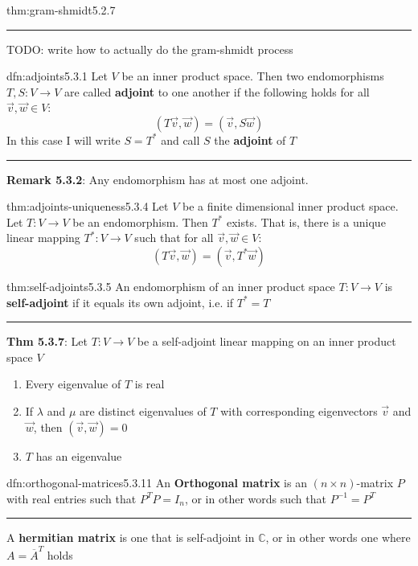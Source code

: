 \documentclass[landscape, 8pt]{extarticle}
\begin{document}
\begin{multicols}{3}
\begin{thm}{thm:gram-shmidt}{5.2.7}
    \noindent\rule{\textwidth}{0.2pt}
    TODO: write how to actually do the gram-shmidt process
\end{thm}

\begin{dfn}[Adjoints]{dfn:adjoints}{5.3.1}
    Let $V$ be an inner product space. Then two endomorphisms $T, S : V\to V$ are called \textbf{adjoint} to one another if the following holds for all $\vec{v}, \vec{w}\in V$:
    \[(T \vec{v}, \vec{w}) = (\vec{v}, S\vec{w})\]
    In this case I will write $S = T^{*}$ and call $S$ the \textbf{adjoint} of $T$

    \noindent\rule{\textwidth}{0.2pt}
    \textbf{Remark 5.3.2}: Any endomorphism has at most one adjoint.
\end{dfn}

\begin{thm}[]{thm:adjoints-uniqueness}{5.3.4}
    Let $V$ be a finite dimensional inner product space. Let $T : V \to V$ be an endomorphism. Then $T^{*}$ exists. That is, there is a unique linear mapping $T^{*} : V \to V$ such that for all $\vec{v}, \vec{w}\in V$:
    \[(T \vec{v}, \vec{w}) = (\vec{v}, T^{*}\vec{w})\]
\end{thm}

\begin{dfn}{thm:self-adjoints}{5.3.5}
    An endomorphism of an inner product space $T : V \to V$ is \textbf{self-adjoint} if it equals its own adjoint, i.e. if $T^{*} = T$

    \noindent\rule{\textwidth}{0.2pt}
    \textbf{Thm 5.3.7}: Let $T : V\to V$ be a self-adjoint linear mapping on an inner product space $V$
    \begin{enumerate}
        \setlength\itemsep{0em}
        \item Every eigenvalue of $T$ is real
        \item If $\lambda$ and $\mu$ are distinct eigenvalues of $T$ with corresponding eigenvectors $\vec{v}$ and $\vec{w}$, then $(\vec{v}, \vec{w}) = 0$
        \item $T$ has an eigenvalue
    \end{enumerate}
\end{dfn}

\begin{dfn}{dfn:orthogonal-matrices}{5.3.11}
    An \textbf{Orthogonal matrix} is an $(n \times n)$-matrix $P$ with real entries such that $P^{T}P = I_{n}$, or in other words such that $P^{-1} = P^{T}$

    \noindent\rule{\textwidth}{0.2pt}
    A \textbf{hermitian matrix} is one that is self-adjoint in $\mathbb{C}$, or in other words one where $A = \overline{A}^{T}$ holds



\end{dfn}
\end{multicols}
\end{document}
